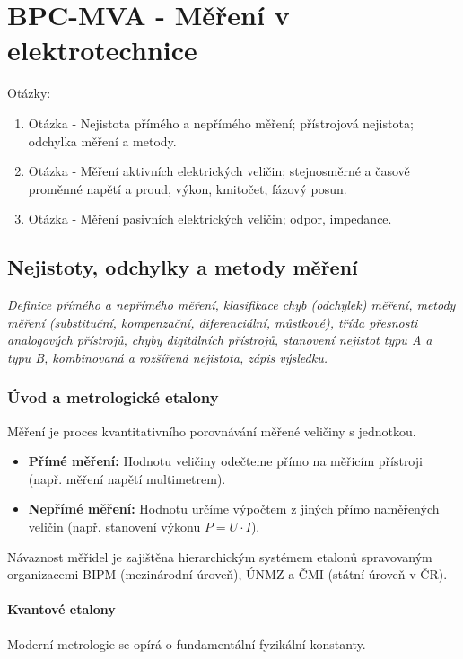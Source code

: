 \part{BPC-MVA - Měření v elektrotechnice}
{\huge Otázky:}
\newline
\begin{enumerate}
	\item Otázka - Nejistota přímého a nepřímého měření; přístrojová nejistota; odchylka měření a metody. 
	\item Otázka - Měření aktivních elektrických veličin; stejnosměrné a časově proměnné napětí a proud, výkon, kmitočet, fázový posun.
	\item Otázka - Měření pasivních elektrických veličin; odpor, impedance. 
\end{enumerate}
\newpage
\chapter{Nejistoty, odchylky a metody měření}
\label{ch:nejistoty}

\noindent\textit{Definice přímého a nepřímého měření, klasifikace chyb (odchylek) měření, metody měření (substituční, kompenzační, diferenciální, můstkové), třída přesnosti analogových přístrojů, chyby digitálních přístrojů, stanovení nejistot typu A a typu B, kombinovaná a rozšířená nejistota, zápis výsledku.}

\section{Úvod a metrologické etalony}
Měření je proces kvantitativního porovnávání měřené veličiny s jednotkou.
\begin{itemize}
    \item \textbf{Přímé měření:} Hodnotu veličiny odečteme přímo na měřicím přístroji (např. měření napětí multimetrem).
    \item \textbf{Nepřímé měření:} Hodnotu určíme výpočtem z jiných přímo naměřených veličin (např. stanovení výkonu $P = U \cdot I$).
\end{itemize}

Návaznost měřidel je zajištěna hierarchickým systémem etalonů spravovaným organizacemi BIPM (mezinárodní úroveň), ÚNMZ a ČMI (státní úroveň v ČR).

\subsection{Kvantové etalony}
Moderní metrologie se opírá o fundamentální fyzikální konstanty.

